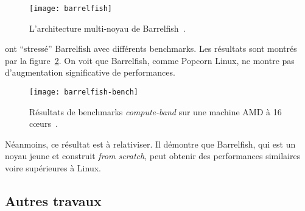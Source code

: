       \begin{figure}[ht]
        \centering \texttt{[image: barrelfish]}
        \caption{L'architecture multi-noyau de
          Barrelfish~\citep{baumann2009multikernel}.}
        \label{fig:barrelfish}
      \end{figure}

      \citeauthor{baumann2009multikernel} ont ``stressé'' Barrelfish avec
      différents benchmarks. Les résultats sont montrés par la
      figure~\ref{fig:barrelfish-bench}. On voit que Barrelfish, comme Popcorn
      Linux, ne montre pas d'augmentation significative de performances.

      \begin{figure}[ht]
        \centering
        \texttt{[image: barrelfish-bench]}
        \caption{Résultats de benchmarks \textit{compute-band} sur une machine
          AMD à 16 c\oe urs~\citep{baumann2009multikernel}.}
        \label{fig:barrelfish-bench}
      \end{figure}

      Néanmoins, ce résultat est à relativiser. Il démontre que Barrelfish, qui
      est un noyau jeune et construit \textit{from scratch}, peut obtenir des
      performances similaires voire supérieures à Linux.

    \subsection{Autres travaux}
    \label{subsec:others}
    
